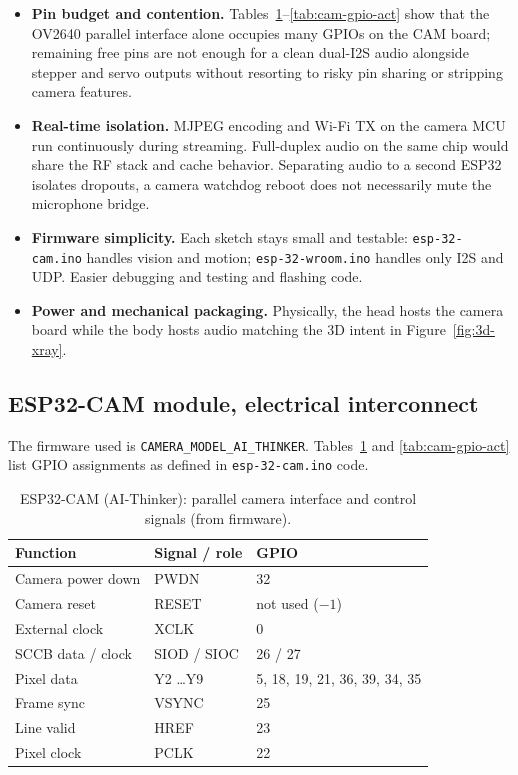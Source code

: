 \begin{itemize}
    \item \textbf{Pin budget and contention.} Tables~\ref{tab:cam-gpio-camera}--\ref{tab:cam-gpio-act} show that the OV2640 parallel interface alone occupies many GPIOs on the CAM board; remaining free pins are not enough for a clean dual-I2S audio alongside stepper and servo outputs without resorting to risky pin sharing or stripping camera features.
    \item \textbf{Real-time isolation.} MJPEG encoding and Wi-Fi TX on the camera MCU run continuously during streaming. Full-duplex audio on the same chip would share the RF stack and cache behavior. Separating audio to a second ESP32 isolates dropouts, a camera watchdog reboot does not necessarily mute the microphone bridge.
    \item \textbf{Firmware simplicity.} Each sketch stays small and testable: \texttt{esp-32-cam.ino} handles vision and motion; \texttt{esp-32-wroom.ino} handles only I2S and UDP. Easier debugging and testing and flashing code.
    \item \textbf{Power and mechanical packaging.} Physically, the head hosts the camera board while the body hosts audio matching the 3D intent in Figure~\ref{fig:3d-xray}.
\end{itemize}



\subsection{ESP32-CAM module, electrical interconnect}

The firmware used is \texttt{CAMERA\_MODEL\_AI\_THINKER}. Tables~\ref{tab:cam-gpio-camera} and \ref{tab:cam-gpio-act} list GPIO assignments as defined in \texttt{esp-32-cam.ino} code. 

\begin{table}[H]
\centering
\caption{ESP32-CAM (AI-Thinker): parallel camera interface and control signals (from firmware).}
\label{tab:cam-gpio-camera}
\begin{tabular}{@{}lll@{}}
\toprule
\textbf{Function} & \textbf{Signal / role} & \textbf{GPIO} \\
\midrule
Camera power down & PWDN & 32 \\
Camera reset & RESET & not used ($-1$) \\
External clock & XCLK & 0 \\
SCCB data / clock & SIOD / SIOC & 26 / 27 \\
Pixel data & Y2 \ldots Y9 & 5, 18, 19, 21, 36, 39, 34, 35 \\
Frame sync & VSYNC & 25 \\
Line valid & HREF & 23 \\
Pixel clock & PCLK & 22 \\
\bottomrule
\end{tabular}
\end{table}

